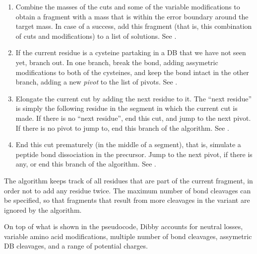 \begin{enumerate}
  \item Combine the masses of the  cuts and some of the variable modifications to obtain a fragment with a mass that is within the error boundary around the target mass. In case of a success, add this fragment (that is, this combination of cuts and modifications) to a list of solutions. See .
  \item If the current residue is a cysteine partaking in a DB that we have not seen yet, branch out. In one branch, break the bond, adding assymetric modifications to both of the cysteines, and keep the bond intact in the other branch, adding a new \emph{pivot} to the list of pivots. See .
  \item Elongate the current cut by adding the next residue to it. The ``next residue'' is simply the following residue in the segment in which the current cut is made. If there is no ``next residue'', end this cut, and jump to the next pivot. If there is no pivot to jump to, end this branch of the algorithm. See .
  \item End this cut prematurely (in the middle of a segment), that is, simulate a peptide bond dissociation in the precursor. Jump to the next pivot, if there is any, or end this branch of the algorithm. See .
\end{enumerate}

The algorithm keeps track of all residues that are part of the current fragment, in order not to add any residue twice. The maximum number of bond cleavages can be specified, so that fragments that result from more cleavages in the variant are ignored by the algorithm.

On top of what is shown in the pseudocode, Dibby accounts for neutral losses, variable amino acid modifications, multiple number of bond cleavages, assymetric DB cleavages, and a range of potential charges.

